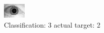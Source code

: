 \begin{figure}[h!]
\begin{center}
\includegraphics[width=0.60\columnwidth]{figures/ID1649_class_3_target_2.png}
\end{center}
\caption{ Classification: 3 actual target: 2}
\label{fig:ID1649_class_3_target_2}
\end{figure}
